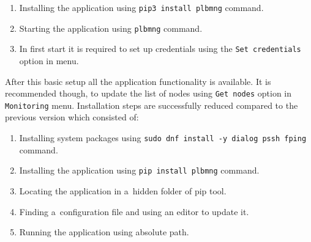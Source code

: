 {{{{{{{\begin{enumerate}
	\item Installing the application using \texttt{pip3 install plbmng} command.
	\item Starting the application using \texttt{plbmng} command.
	\item In first start it is required to set up credentials using the \texttt{Set credentials} option in menu.
\end{enumerate}

After this basic setup all the application functionality is available. It is recommended though, to update the list of nodes using \texttt{Get nodes} option in \texttt{Monitoring} menu. Installation steps are successfully reduced compared to the previous version which consisted of:

\begin{enumerate}
	\item Installing system packages using \texttt{sudo dnf install -y dialog pssh fping} command.
	\item Installing the application using \texttt{pip install plbmng} command.
	\item Locating the application in a~hidden folder of pip tool.
	\item Finding a~configuration file and using an editor to update it.
	\item Running the application using absolute path.
\end{enumerate}

}}}}}}}
